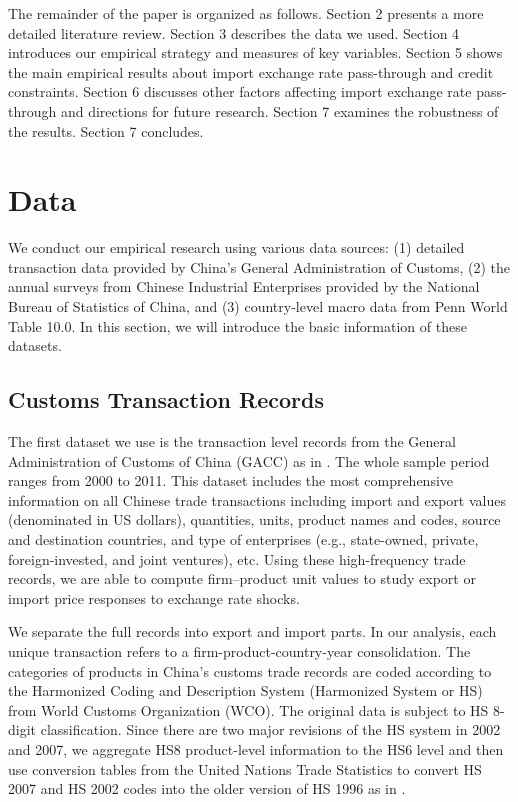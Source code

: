 \documentclass[12pt]{article}
\begin{document}
The remainder of the paper is organized as follows. Section 2 presents a more detailed literature review. Section 3 describes the data we used. Section 4 introduces our empirical strategy and measures of key variables. Section 5 shows the main empirical results about import exchange rate pass-through and credit constraints. Section 6 discusses other factors affecting import exchange rate pass-through and directions for future research. Section 7 examines the robustness of the results. Section 7 concludes.

\section{Data} \label{Data}

We conduct our empirical research using various data sources: (1) detailed transaction data provided by China’s General Administration of Customs, (2) the annual surveys from Chinese Industrial Enterprises provided by the National Bureau of Statistics of China, and (3) country-level macro data from Penn World Table 10.0. In this section, we will introduce the basic information of these datasets.

\subsection{Customs Transaction Records} \label{Data-Customs}

The first dataset we use is the transaction level records from the General Administration of Customs of China (GACC) as in \cite{manova-zhang2012}. The whole sample period ranges from 2000 to 2011. This dataset includes the most comprehensive information on all Chinese trade transactions including import and export values (denominated in US dollars), quantities, units, product names and codes, source and destination countries, and type of enterprises (e.g., state-owned, private, foreign-invested, and joint ventures), etc. Using these high-frequency trade records, we are able to compute firm–product unit values to study export or import price responses to exchange rate shocks. 

We separate the full records into export and import parts. In our analysis, each unique transaction refers to a firm-product-country-year consolidation. The categories of products in China's customs trade records are coded according to the Harmonized Coding and Description System (Harmonized System or HS) from World Customs Organization (WCO). The original data is subject to HS 8-digit classification. Since there are two major revisions of the HS system in 2002 and 2007, we aggregate HS8 product-level information to the HS6 level and then use conversion tables from the United Nations Trade Statistics to convert HS 2007 and HS 2002 codes into the older version of HS 1996 as in \cite{fan-li-yeaple2015}.
\end{document}
